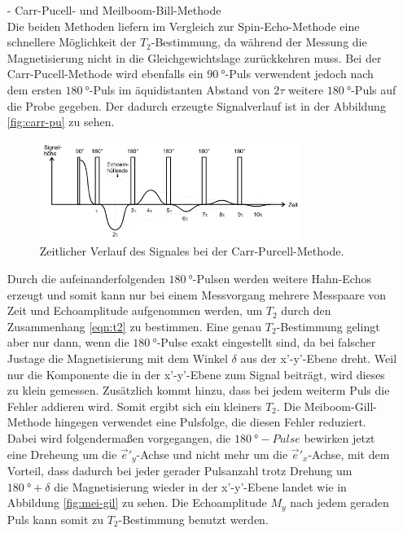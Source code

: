 \begin{itemize}
\item[-] Carr-Pucell- und Meilboom-Bill-Methode\\
Die beiden Methoden liefern im Vergleich zur Spin-Echo-Methode eine
schnellere Möglichkeit der $T_2$-Bestimmung, da während der Messung die Magnetisierung
nicht in die Gleichgewichtslage zurückkehren muss.
Bei der Carr-Pucell-Methode wird ebenfalls ein $\SI{90}{\degree}$-Puls
verwendent jedoch nach dem ersten $\SI{180}{\degree}$-Puls
im äquidistanten Abstand von $2\tau$ weitere $\SI{180}{\degree}$-Puls
auf die Probe gegeben. Der dadurch erzeugte Signalverlauf
ist in der Abbildung \ref{fig:carr-pu} zu sehen.

\begin{figure}
  \includegraphics[width=0.8\textwidth]{carr-pu.PNG}
  \caption{Zeitlicher Verlauf des Signales bei der Carr-Purcell-Methode.\cite{sample}}
  \label{fig:tau_ver}
\end{figure}
Durch die aufeinanderfolgenden $\SI{180}{\degree}$-Pulsen werden
weitere Hahn-Echos erzeugt und
somit kann nur bei einem Messvorgang mehrere Messpaare von Zeit und
Echoamplitude aufgenommen werden, um $T_2$ durch den Zusammenhang \eqref{eqn:t2} zu bestimmen.
Eine genau $T_2$-Bestimmung gelingt aber nur dann,
wenn die $\SI{180}{\degree}$-Pulse exakt eingestellt sind, da
bei falscher Justage die Magnetisierung mit dem Winkel $\delta$ aus der x'-y'-Ebene
dreht. Weil nur die Komponente die in der x'-y'-Ebene zum Signal beiträgt,
wird dieses zu klein gemessen. Zusätzlich kommt hinzu, dass
bei jedem weiterm Puls die Fehler addieren wird.
Somit ergibt sich ein kleiners $T_2$.
Die Meiboom-Gill-Methode hingegen verwendet eine
Pulsfolge, die diesen Fehler reduziert. Dabei wird folgendermaßen
vorgegangen, die $\SI{180}{\degree}-Pulse$ bewirken
jetzt eine Dreheung um die $\vec{e}'_y$-Achse und nicht mehr
um die $\vec{e}'_x$-Achse, mit dem Vorteil, dass dadurch bei jeder
gerader Pulsanzahl trotz Drehung
um $\SI{180}{\degree}+\delta$ die Magnetisierung wieder in der x'-y'-Ebene
landet wie in Abbildung \ref{fig:mei-gil} zu sehen.
Die Echoamplitude $M_y$ nach jedem geraden Puls kann somit zu
$T_2$-Bestimmung benutzt werden.

\end{itemize}
